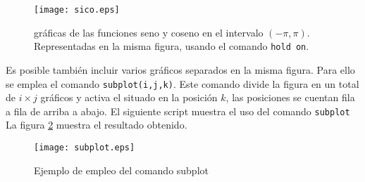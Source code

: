 







\begin{figure}[h]
\centering
\texttt{[image: sico.eps]}
\caption{gráficas de las funciones seno y coseno en el intervalo $(-\pi, \pi)$. Representadas en la misma figura, usando el comando \texttt{hold on}.}
\label{fig:sico}
\end{figure}

Es posible también incluir varios gráficos separados en la misma figura. 
Para ello se emplea el comando \texttt{subplot(i,j,k)}. Este comando divide la figura en un total de $i\times j$ gráficos y activa el situado en la posición $k$, las posiciones se cuentan fila a fila de arriba a abajo. El siguiente script muestra el uso del comando \texttt{subplot} La figura \ref{fig:subplot} muestra el resultado obtenido.
\begin{figure}[h]
\centering
\texttt{[image: subplot.eps]}
\caption{Ejemplo de empleo del comando subplot}
\label{fig:subplot}
\end{figure}








